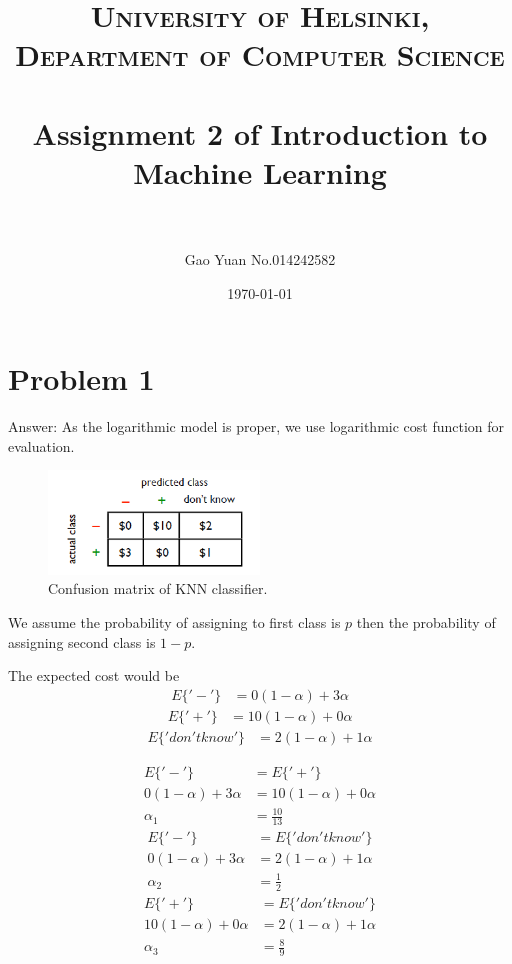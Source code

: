 \documentclass[paper=a4, fontsize=11pt]{scrartcl} %
\title{	
\normalfont \normalsize 
\textsc{University of Helsinki, Department of Computer Science} \\ [25pt] %
\horrule{0.5pt} \\[0.4cm] %
\huge Assignment 2 of Introduction to Machine Learning \\ %
\horrule{2pt} \\[0.5cm] %
}
\author{Gao Yuan No.014242582} %
\date{\normalsize\today} %
\numberwithin{equation}{section} %
\numberwithin{figure}{section} %
\numberwithin{table}{section} %
\begin{document}
\maketitle %


\section{Problem 1}
Answer:
\newline
As the logarithmic model is proper, we use logarithmic cost function for evaluation.
\begin{figure}[h!]
  \centering
    \includegraphics[width=0.5\textwidth]{problem_1_figure}
      \caption{Confusion matrix of KNN classifier.}
\end{figure}
We assume the probability of assigning to first class is $p$ then the probability of assigning second class is $1-p$.


The expected cost would be 
\begin{align}
E\{'-'\} &=  0(1-\alpha) + 3\alpha 
\end{align}
\begin{align}
E\{'+'\} &=  10(1-\alpha) + 0\alpha 
\end{align}
\begin{align}
E\{'don't know'\} &=  2(1-\alpha) + 1\alpha
\end{align}

\begin{align}
E\{'-'\} &= E\{'+'\} \\
0(1-\alpha) + 3\alpha  &=  10(1-\alpha) + 0\alpha  \\
\alpha_1 & = \frac{10}{13}
\end{align}
\begin{align}
E\{'-'\} &= E\{'don't know'\} \\
0(1-\alpha) + 3\alpha  &= 2(1-\alpha) + 1\alpha \\
\alpha_2 & = \frac{1}{2}
\end{align}
\begin{align}
E\{'+'\} &= E\{'don't know'\} \\
10(1-\alpha) + 0\alpha  &= 2(1-\alpha) + 1\alpha \\
\alpha_3 & = \frac{8}{9}
\end{align}
\end{document}
